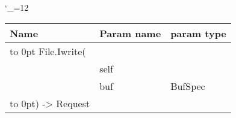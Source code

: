 \begingroup \catcode`\_=12 \tt
\begin{tabular}{lll}
\toprule
\textrm{Name}&\textrm{Param name}&\textrm{param type}\\
\midrule
\hbox to 0pt {File.Iwrite(\hss}\\
& self\\
& buf & BufSpec\\
\hbox to 0pt{) -> Request\hss}\\
\bottomrule
\end{tabular}
\endgroup
